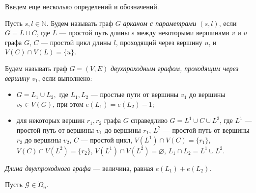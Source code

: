 \documentclass[12pt,a4paper,russian,titlepage]{article}
\begin{document}
Введем еще несколько определений и обозначений.


Пусть $s,l\in\mathbb{N}$. Будем называть граф $G$ {\it арканом с параметрами $(s,l)$}, если $G=L\cup C$, где $L$ --- простой путь длины $s$ между некоторыми вершинами $v$ и $u$ графа $G$, $C$ --- простой цикл длины $l$, проходящий через вершину $u$, и $V(C)\cap V(L)=\{u\}$.


Будем называть граф $G = (V,E)$ \textit{двухпроходным графом, проходящим через вершину $v_1$}, если выполнено:
\begin{itemize}
 \item $G = L_1\cup L_2,$ где $L_1,L_2$ --- простые пути от вершины $v_1$ до вершины $v_2 \in V(G)$, при этом $e(L_1) = e(L_2) - 1$;
 \item для некоторых вершин $r_1,r_2$ графа $G$ справедливо $G=L^1\cup C\cup L^2$, где $L^1$ --- простой путь от вершины $v_1$ до вершины $r_1$, $L^2$ --- простой путь от вершины $r_2$ до вершины $v_2$, $C$ --- простой цикл, $V(L^1)\cap V(C)=\{r_1\}$, $V(C)\cap V(L^2)=\{r_2\}$, $V(L^1)\cap V(L^2)=\varnothing$, $L_1 \cap L_2=L^1\cup L^2$.%

\end{itemize}


\textit{Длина двухпроходного графа} --- величина, равная $e(L_1) + e(L_2)$.


Пусть $\mathcal{G}\in\tilde\Omega_n$.
\end{document}

